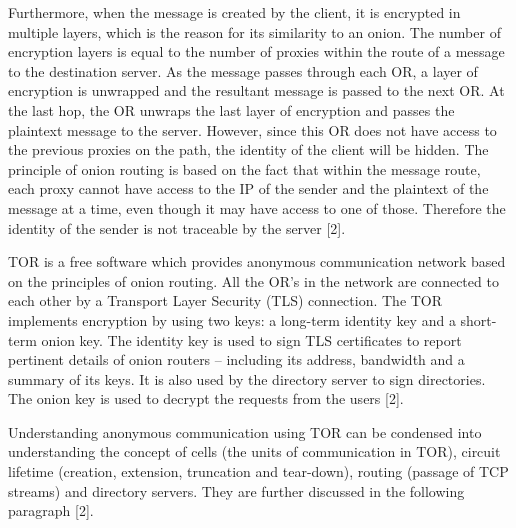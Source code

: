 \documentclass{article}
\begin{document}
\vspace{0.3 cm}

\noindent Furthermore, when the message is created by the client, it is encrypted in multiple layers, which is the reason for its similarity to an onion. The number of encryption layers is equal to the number of proxies within the route of a message to the destination server. As the message passes through each OR, a layer of encryption is unwrapped and the resultant message is passed to the next OR. At the last hop, the OR unwraps the last layer of encryption and passes the plaintext message to the server. However, since this OR does not have access to the previous proxies on the path, the identity of the client will be hidden. The principle of onion routing is based on the fact that within the message route, each proxy cannot have access to the IP of the sender and the plaintext of the message at a time, even though it may have access to one of those. Therefore the identity of the sender is not traceable by the server [2]. \\

\vspace{0.3 cm}

\noindent TOR is a free software which provides anonymous communication network based on the principles of onion routing. All the OR’s in the network are connected to each other by a Transport Layer Security (TLS) connection. The  TOR implements encryption by using two keys: a long-term identity key and a short-term onion key. The identity key is used to sign TLS certificates to report pertinent details of onion routers – including its address, bandwidth and a summary of its keys. It is also used by the directory server to sign directories. The onion key is used to decrypt the requests from the users [2]. \\

\vspace{0.3 cm}

\noindent Understanding anonymous communication using TOR can be condensed into understanding the concept of cells (the units of communication in TOR), circuit lifetime (creation, extension, truncation and tear-down), routing (passage of TCP streams) and directory servers. They are further discussed in the following paragraph [2]. 

\vspace{0.3 cm}
\end{document}
